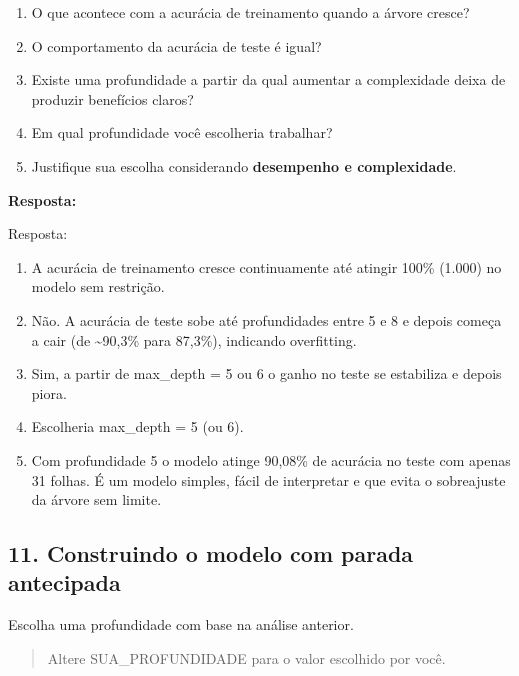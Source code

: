 \documentclass[11pt]{article}
\providecommand{\tightlist}{%
      \setlength{\itemsep}{0pt}\setlength{\parskip}{0pt}}
\begin{document}
\begin{enumerate}
\def\labelenumi{\arabic{enumi}.}
\tightlist
\item
  O que acontece com a acurácia de treinamento quando a árvore cresce?
\item
  O comportamento da acurácia de teste é igual?
\item
  Existe uma profundidade a partir da qual aumentar a complexidade deixa
  de produzir benefícios claros?
\item
  Em qual profundidade você escolheria trabalhar?
\item
  Justifique sua escolha considerando \textbf{desempenho e
  complexidade}.
\end{enumerate}

\textbf{Resposta:}

    Resposta:

\begin{enumerate}
\def\labelenumi{\arabic{enumi}.}
\tightlist
\item
  A acurácia de treinamento cresce continuamente até atingir 100\%
  (1.000) no modelo sem restrição.
\item
  Não. A acurácia de teste sobe até profundidades entre 5 e 8 e depois
  começa a cair (de \textasciitilde90,3\% para 87,3\%), indicando
  overfitting.
\item
  Sim, a partir de max\_depth = 5 ou 6 o ganho no teste se estabiliza e
  depois piora.
\item
  Escolheria max\_depth = 5 (ou 6).
\item
  Com profundidade 5 o modelo atinge 90,08\% de acurácia no teste com
  apenas 31 folhas. É um modelo simples, fácil de interpretar e que
  evita o sobreajuste da árvore sem limite.
\end{enumerate}

    \subsection{11. Construindo o modelo com parada
antecipada}\label{construindo-o-modelo-com-parada-antecipada}

Escolha uma profundidade com base na análise anterior.

\begin{quote}
Altere SUA\_PROFUNDIDADE para o valor escolhido por você.
\end{quote}
\end{document}
